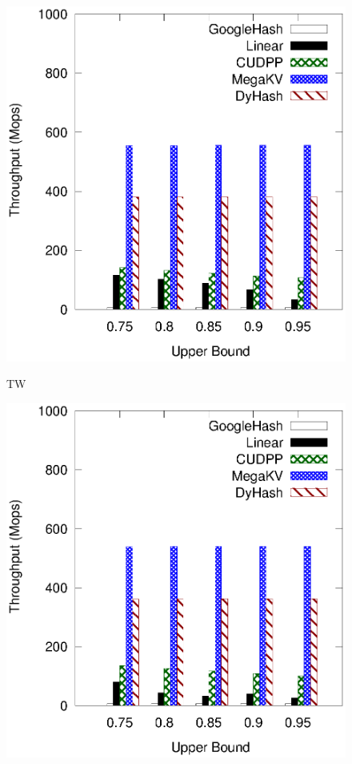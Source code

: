 \begin{figure}[h]
	\begin{minipage}{0.19\linewidth}\centering
		\includegraphics[width=\linewidth]{pic/static-upper/upper_search_twitter.eps}
		\centerline{TW}
	\end{minipage}
	\hfill
	\begin{minipage}{0.19\linewidth}\centering
	\includegraphics[width=\linewidth]{pic/static-upper/upper_search_reddit.eps}

\end{minipage}
\end{figure}
